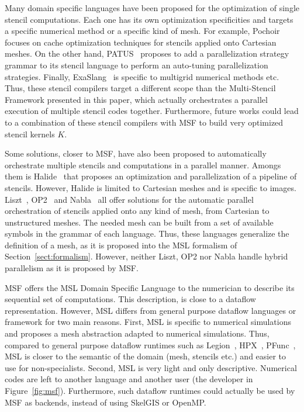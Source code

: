 Many domain specific languages have been proposed for the optimization of single stencil computations.
Each one has its own optimization specificities and targets a specific numerical method or a specific kind of mesh.
For example, Pochoir~\cite{spaaTangCKLL11} focuses on cache optimization techniques for stencils applied onto Cartesian meshes.
On the other hand, PATUS~\cite{citeulike12258902} proposes to add a parallelization strategy grammar to its stencil language to perform an auto-tuning parallelization strategies. Finally, ExaSlang~\cite{Schmitt:2014:EDL:2691166.2691171} is specific to multigrid numerical methods etc. Thus, these stencil compilers target a different scope than the Multi-Stencil Framework presented in this paper, which actually orchestrates a parallel execution of multiple stencil codes together. Furthermore, future works could lead to a combination of these stencil compilers with MSF to build very optimized stencil kernels $K$.

Some solutions, closer to MSF, have also been proposed to automatically orchestrate multiple stencils and computations in a parallel manner. Amongs them is Halide~\cite{Ragan-Kelley:2013:HLC:2491956.2462176} that proposes an optimization and parallelization of a pipeline of stencils. However, Halide is limited to Cartesian meshes and is specific to images. Liszt~\cite{DeVito:2011:LDS:2063384.2063396}, OP2~\cite{} and Nabla~\cite{Camier:2015:IPP:2820083.2820107} all offer solutions for the automatic parallel orchestration of stencils applied onto any kind of mesh, from Cartesian to unstructured meshes. The needed mesh can be built from a set of available symbols in the grammar of each language. Thus, these languages generalize the definition of a mesh, as it is proposed into the MSL formalism of Section~\ref{sect:formalism}. However, neither Liszt, OP2 nor Nabla handle hybrid parallelism as it is proposed by MSF.

MSF offers the MSL Domain Specific Language to the numerician to describe its sequential set of computations. This description, is close to a dataflow representation. However, MSL differs from general purpose dataflow languages or framework for two main reasons. First, MSL is specific to numerical simulations and proposes a mesh abstraction adapted to numerical simulations. Thus, compared to general purpose dataflow runtimes such as Legion~\cite{bauer:legion:sc:2012}, HPX~\cite{}, PFunc~\cite{}, MSL is closer to the semantic of the domain (mesh, stencils etc.) and easier to use for non-specialists. Second, MSL is very light and only descriptive. Numerical codes are left to another language and another user (the developer in Figure~\ref{fig:msf}). Furthermore, such dataflow runtimes could actually be used by MSF as backends, instead of using SkelGIS or OpenMP.

